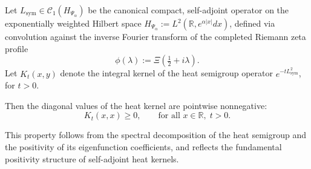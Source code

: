 \begin{lemma}
\label{lem:heat-kernel-diagonal-positivity}
Let \( L_{\mathrm{sym}} \in \mathcal{C}_1(H_{\Psi_\alpha}) \) be the canonical compact, self-adjoint operator on the exponentially weighted Hilbert space \( H_{\Psi_\alpha} := L^2(\mathbb{R}, e^{\alpha |x|} dx) \), defined via convolution against the inverse Fourier transform of the completed Riemann zeta profile
\[
\phi(\lambda) := \Xi\left(\tfrac{1}{2} + i\lambda\right).
\]
Let \( K_t(x, y) \) denote the integral kernel of the heat semigroup operator \( e^{-t L_{\mathrm{sym}}^2} \), for \( t > 0 \).

\medskip
\noindent
Then the diagonal values of the heat kernel are pointwise nonnegative:
\[
K_t(x,x) \geq 0, \qquad \text{for all } x \in \mathbb{R}, \; t > 0.
\]

\medskip
\noindent
This property follows from the spectral decomposition of the heat semigroup and the positivity of its eigenfunction coefficients, and reflects the fundamental positivity structure of self-adjoint heat kernels.
\end{lemma}
